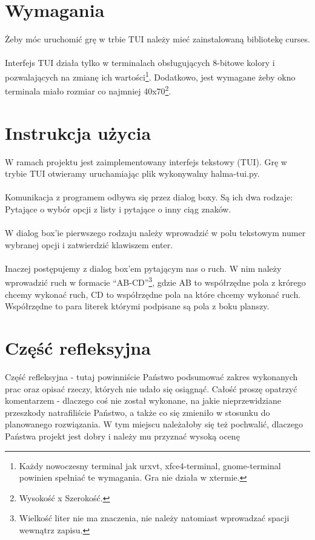\documentclass[12pt, titlepage]{article}
\begin{document}
\pagebreak
\section{Wymagania}
Żeby móc uruchomić grę w trbie TUI należy mieć zainstalowaną
bibliotekę curses.
\\~\\
Interfejs TUI działa tylko w terminalach obsługujących 8-bitowe
kolory i pozwalających na zmianę ich wartości\footnote{Każdy nowoczesny terminal jak urxvt, xfce4-terminal, gnome-terminal powinien spełniać te wymagania. Gra nie działa w xtermie.}.
Dodatkowo, jest wymagane żeby okno terminala miało rozmiar co
najmniej 40x70\footnote{Wysokość x Szerokość.}.

\section{Instrukcja użycia}
W ramach projektu jest zaimplementowany interfejs tekstowy (TUI).
Grę w trybie TUI otwieramy uruchamiając plik wykonywalny
halma-tui.py.
\\~\\
Komunikacja z programem odbywa się przez dialog boxy.
Są ich dwa rodzaje: Pytające o wybór opcji z listy i
pytające o inny ciąg znaków.
\\~\\
W dialog box'ie pierwszego rodzaju należy wprowadzić w
polu tekstowym numer wybranej opcji i zatwierdzić
klawiszem enter.
\\~\\
Inaczej postępujemy z dialog box'em pytającym nas o ruch.
W nim należy wprowadzić ruch w formacie "`AB-CD"'\footnote{Wielkość liter nie ma znaczenia, nie należy natomiast wprowadzać spacji wewnątrz zapisu.}, gdzie AB
to współrzędne pola z krórego chcemy wykonać ruch, CD to
współrzędne pola na które chcemy wykonać ruch. Współrzędne
to para literek którymi podpisane są pola z boku planszy.

\section{Część refleksyjna}
Część refleksyjna - tutaj powinniście Państwo podsumować zakres wykonanych prac oraz opisać rzeczy, których nie udało się osiągnąć. Całość proszę opatrzyć komentarzem - dlaczego coś nie został wykonane, na jakie nieprzewidziane przeszkody natrafiliście Państwo, a także co się zmieniło w stosunku do planowanego rozwiązania. W tym miejscu należałoby się też pochwalić, dlaczego Państwa projekt jest dobry i należy mu przyznać wysoką ocenę
\end{document}
